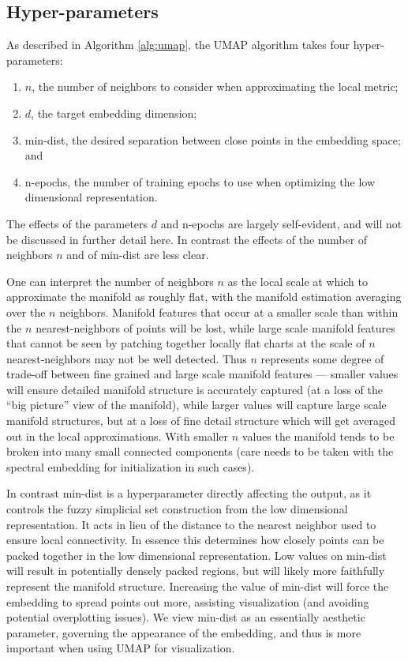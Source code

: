 \documentclass[12pt]{article}
\begin{document}
\subsection{Hyper-parameters}

As described in Algorithm \ref{alg:umap}, the UMAP algorithm takes four hyper-parameters:
\begin{enumerate}
    \item $n$, the number of neighbors to consider when approximating the local metric;
    \item $d$, the target embedding dimension;
    \item min-dist, the desired separation between close points in the embedding space; and
    \item n-epochs, the number of training epochs to use when optimizing the low dimensional representation.
\end{enumerate}   
The effects of the parameters $d$ and n-epochs are largely self-evident, and will not be discussed in further detail here. In contrast the effects of the number of neighbors $n$ and of min-dist are less clear.

One can interpret the number of neighbors $n$ as the local scale at which to approximate the manifold as roughly flat, with the manifold estimation averaging over the $n$ neighbors. Manifold features that occur at a smaller scale than within the $n$ nearest-neighbors of points will be lost, while large scale manifold features that cannot be seen by patching together locally flat charts at the scale of $n$ nearest-neighbors may not be well detected. Thus $n$ represents some degree of trade-off between fine grained and large scale manifold features --- smaller values will ensure detailed manifold structure is accurately captured (at a loss of the ``big picture'' view of the manifold), while larger values will capture large scale manifold structures, but at a loss of fine detail structure which will get averaged out in the local approximations. With smaller $n$ values the manifold tends to be broken into many small connected components (care needs to be taken with the spectral embedding for initialization in such cases).

In contrast min-dist is a hyperparameter directly affecting the output, as it controls the fuzzy simplicial set construction from the low dimensional representation. It acts in lieu of the distance to the nearest neighbor used to ensure local connectivity. In essence this determines how closely points can be packed together in the low dimensional representation. Low values on min-dist will result in potentially densely packed regions, but will likely more faithfully represent the manifold structure. Increasing the value of min-dist will force the embedding to spread points out more, assisting visualization (and avoiding potential overplotting issues). We view min-dist as an essentially aesthetic parameter, governing the appearance of the embedding, and thus is more important when using UMAP for visualization.
\end{document}
